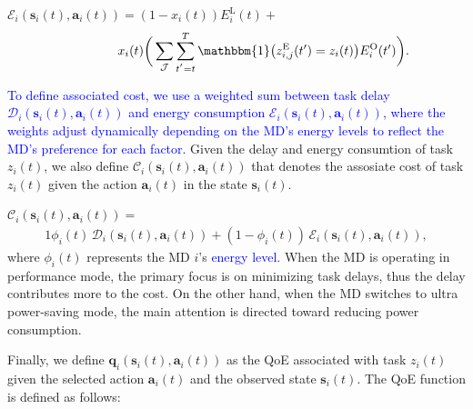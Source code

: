 \documentclass[10pt, journal,letterpaper]{IEEEtran}
\begin{document}
$\mathcal{E}_i(\boldsymbol{s}_i(t),\boldsymbol{a}_i(t)) = (1-x_i(t)) E_i^{\text{L}}(t)+$
\begin{alignat}{1}
	\hspace{1.5cm} x_i(t)\bigg( \sum\limits_{\mathcal{J}} \sum\limits_{t^{'}=t}^{T}\mathbbm{1}\big(z_{i,j}^{\text{E}}(t') = z_i(t)\big)
	  E_i^{\text{O}}(t')  \bigg).
	\label{22}  
\end{alignat}

\textcolor{blue}{To define associated cost, we use a weighted sum between task delay $\mathcal{D}_i(\boldsymbol{s}_i(t),\boldsymbol{a}_i(t))$ and energy consumption $\mathcal{E}_i(\boldsymbol{s}_i(t),\boldsymbol{a}_i(t))$, where the weights adjust dynamically depending on the MD's energy levels to reflect the MD's preference for each factor.}
Given the delay and energy consumtion of task $z_i(t)$, we also define $\mathcal{C}_i(\boldsymbol{s}_i(t),\boldsymbol{a}_i(t))$ that denotes the assosiate cost of task $z_i(t)$ given the action $\boldsymbol{a}_i(t)$ in the state $\boldsymbol{s}_i(t)$. \vspace{1.7mm}


$\mathcal{C}_i(\boldsymbol{s}_i(t),\boldsymbol{a}_i(t)) =$
\begin{alignat}{1}
	\phi_i(t) \, \mathcal{D}_i(\boldsymbol{s}_i(t),\boldsymbol{a}_i(t)) +(1-\phi_i(t)) \, \mathcal{E}_i(\boldsymbol{s}_i(t),\boldsymbol{a}_i(t)),
	\label{23}  
\end{alignat}
where $\phi_i(t)$ represents the MD $i$'s \textcolor{blue}{energy level}. When the MD is operating in performance mode, the primary focus is on minimizing task delays, thus the delay contributes more to the cost. On the other hand, when the MD switches to ultra power-saving mode, the main attention is directed toward reducing power consumption.

Finally, we define $\boldsymbol{q}_i(\boldsymbol{s}_i(t),\boldsymbol{a}_i(t))$ as the QoE associated with task $z_i(t)$ given the selected action $\boldsymbol{a}_i(t)$ and the observed state $\boldsymbol{s}_i(t)$. The QoE function is defined as follows:\vspace{1.7mm}
\end{document}
